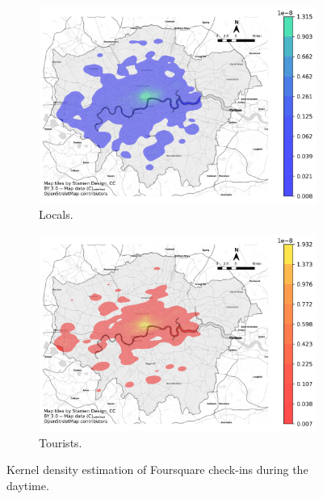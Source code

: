 \documentclass{article}
\begin{document}
\begin{figure}[!h]

\begin{subfigure}{0.5\textwidth}
\includegraphics[width=1\linewidth]{figures/kde_locals_daytime.png} 
\caption{Locals.}
\label{fig:kde_locals_daytime}
\end{subfigure}
\begin{subfigure}{0.5\textwidth}
\includegraphics[width=1\linewidth]{figures/kde_tourists_daytime.png}
\caption{Tourists.}
\label{fig:kde_tourists_daytime}
\end{subfigure}

\caption{Kernel density estimation of Foursquare check-ins during the daytime.} \label{fig:kde_daytime}
\end{figure}
\end{document}
